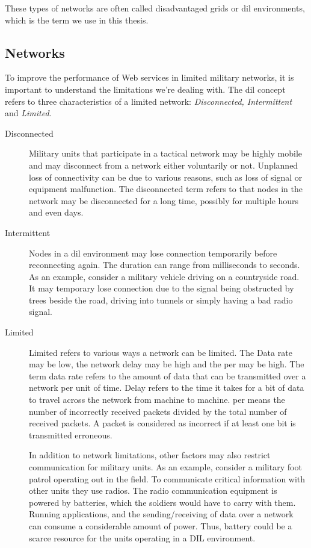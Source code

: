 These types of networks are often called disadvantaged grids or \gls{dil}
environments, which is the term we use in this thesis.

\subsection{ Networks}
\label{dil}

To improve the performance of Web services in limited military networks, it is
important to understand the limitations we're dealing with. The \gls{dil}
concept refers to three characteristics of a limited network:
\textit{Disconnected, Intermittent} and \textit{Limited}.

\begin{description}
\item[Disconnected]

Military units that participate in a tactical network may be highly mobile and
may disconnect from a network either voluntarily or not. Unplanned loss of
connectivity can be due to various reasons, such as loss of signal or equipment
malfunction.  The disconnected term refers to that nodes in the network may be
disconnected for a long time, possibly for multiple hours and even days.

\item[Intermittent]

Nodes in a \gls{dil} environment may lose connection temporarily before
reconnecting again. The duration can range from milliseconds to seconds. As an
example, consider a military vehicle driving on a countryside road. It may
temporary lose connection due to the signal being obstructed by trees beside
the road, driving into tunnels or simply having a bad radio signal.

\item[Limited] Limited refers to various ways a network can be limited. The Data
rate may be low, the network delay may be high and the \gls{per} may be high.
The term data rate refers to the amount of data that can be transmitted over a
network per unit of time. Delay refers to the time it takes for a bit of data to
travel across the network from machine to machine. \gls{per} means the number of
incorrectly received packets divided by the total number of received packets. A
packet is considered as incorrect if at least one bit is transmitted erroneous.

In addition to network limitations, other factors may also restrict
communication for military units. As an example, consider a military foot patrol
operating out in the field. To communicate critical information with other units
they use radios. The radio communication equipment is powered by batteries,
which the soldiers would have to carry with them. Running applications, and the
sending/receiving of data over a network can consume a considerable amount of
power. Thus, battery could be a scarce resource for the units operating in a DIL
environment.

\end{description}

